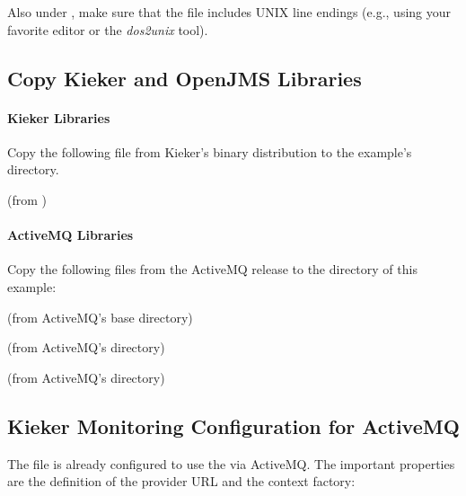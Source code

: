 \noindent Also under \UnixLikeSystems{}, make sure that the file  %
includes UNIX line endings (e.g., using your favorite editor or the \textit{dos2unix} tool).

\subsection{Copy Kieker and OpenJMS Libraries}

\paragraph*{Kieker Libraries}

Copy the following file from Kieker's binary distribution to %
the example's  directory.

\medskip

\begin{compactenum}
 \item \file{\mainJarEMF} (from )
\end{compactenum}

\paragraph*{ActiveMQ Libraries}

Copy the following files from the ActiveMQ release to the %
 directory of this example:

\medskip

\begin{compactenum}
\item {} (from ActiveMQ's base directory)
\item {} (from ActiveMQ's  directory)
\item {} (from ActiveMQ's  directory)
\end{compactenum}

\subsection{Kieker Monitoring Configuration for ActiveMQ}

The file  %
is already configured to use the  via ActiveMQ. The important properties are %
the definition of the provider URL and the context factory:

